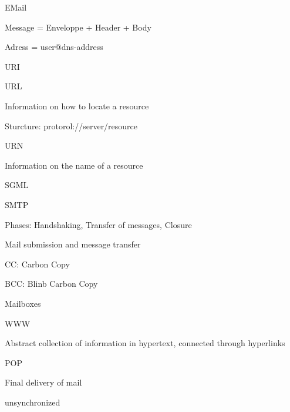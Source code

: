 \documentclass[main.tex]{subfiles}
\begin{document}
\begin{card}{EMail}
\item Message = Enveloppe + Header + Body
\item Adress = user@dns-address
\end{card}


\begin{card}{URI}
\item 
\end{card}


\begin{card}{URL}
\item Information on how to locate a resource
\item Sturcture: protorol://server/resource
\end{card}


\begin{card}{URN}
\item Information on the name of a resource
\end{card}


\begin{card}{SGML}
\item 
\end{card}


\begin{card}{SMTP}
\item Phases: Handshaking, Transfer  of  messages, Closure
\item Mail submission and message transfer
\item CC: Carbon Copy
\item BCC: Blinb Carbon Copy
\item Mailboxes
\end{card}



\begin{card}{WWW}
\item Abstract collection of information in hypertext, connected through hyperlinks
\end{card}

\begin{card}{POP}
\item Final delivery of mail
\item unsynchronized
\end{card}
\end{document}
